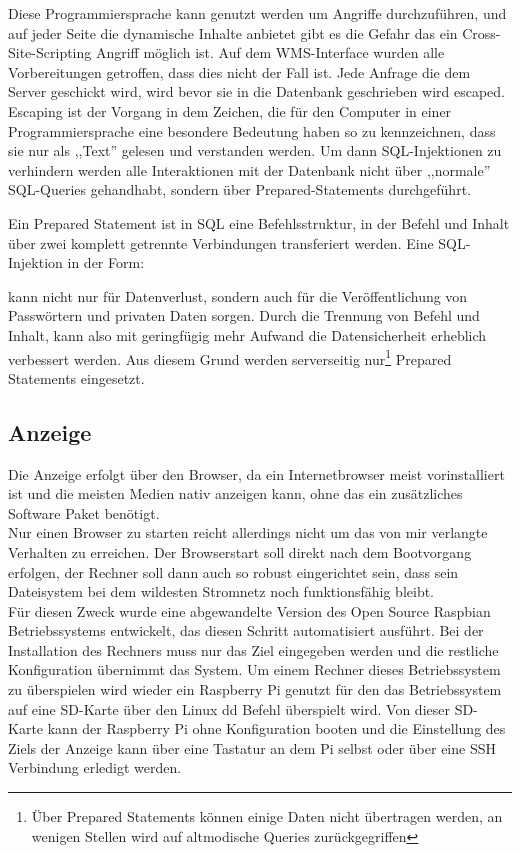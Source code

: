 Diese Programmiersprache kann genutzt werden um Angriffe durchzuführen, und
auf jeder Seite die dynamische Inhalte anbietet gibt es die Gefahr das ein
Cross-Site-Scripting Angriff möglich ist.
Auf dem WMS-Interface wurden alle Vorbereitungen getroffen, dass dies nicht der
Fall ist. Jede Anfrage die dem Server geschickt wird, wird bevor sie in die Datenbank
geschrieben wird escaped. Escaping ist der Vorgang in dem Zeichen, die für den
Computer in einer Programmiersprache eine besondere Bedeutung haben so zu kennzeichnen,
dass sie nur als ,,Text'' gelesen und verstanden werden.
Um dann SQL-Injektionen zu verhindern werden alle Interaktionen mit der Datenbank
nicht über ,,normale'' SQL-Queries gehandhabt, sondern über Prepared-Statements
durchgeführt.

Ein Prepared Statement ist in SQL eine Befehlsstruktur, in der Befehl und Inhalt
über zwei komplett getrennte Verbindungen transferiert werden.
Eine SQL-Injektion in der Form:

kann nicht nur für Datenverlust, sondern auch für die Veröffentlichung
von Passwörtern und privaten Daten sorgen. Durch die Trennung von Befehl und Inhalt,
kann also mit geringfügig mehr Aufwand die Datensicherheit erheblich verbessert werden.
Aus diesem Grund werden serverseitig nur\footnote{Über Prepared Statements
können einige Daten nicht übertragen werden, an wenigen Stellen wird auf altmodische
Queries zurückgegriffen} Prepared Statements eingesetzt.

\subsection{Anzeige}
Die Anzeige erfolgt über den Browser, da ein Internetbrowser meist vorinstalliert ist
und die meisten Medien nativ anzeigen kann, ohne das ein zusätzliches Software Paket
benötigt. \\
Nur einen Browser zu starten reicht allerdings nicht um das von mir verlangte Verhalten
zu erreichen. Der Browserstart soll direkt nach dem Bootvorgang erfolgen, der Rechner soll
dann auch so robust eingerichtet sein, dass sein Dateisystem bei dem wildesten Stromnetz
noch funktionsfähig bleibt.\\
Für diesen Zweck wurde eine abgewandelte Version des Open Source Raspbian Betriebssystems
entwickelt, das diesen Schritt automatisiert ausführt. Bei der Installation des
Rechners muss nur das Ziel eingegeben werden und die restliche Konfiguration
übernimmt das System. Um einem Rechner dieses Betriebssystem zu überspielen wird
wieder ein Raspberry Pi genutzt für den das Betriebssystem auf eine SD-Karte über
den Linux dd Befehl überspielt wird. Von dieser SD-Karte kann der Raspberry Pi
ohne Konfiguration booten und die Einstellung des Ziels der Anzeige kann über eine
Tastatur an dem Pi selbst oder über eine SSH Verbindung erledigt werden.
